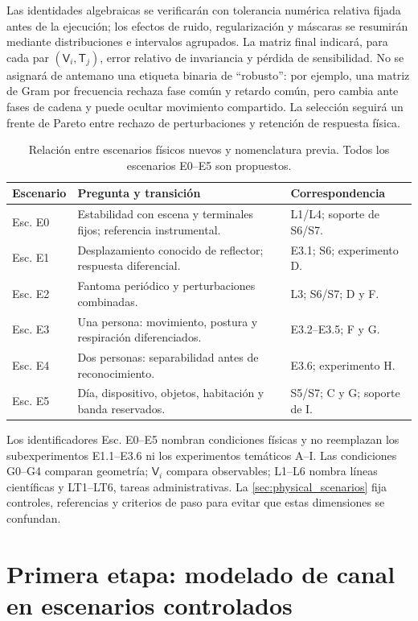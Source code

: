 Las identidades algebraicas se verificarán con tolerancia numérica relativa fijada
antes de la ejecución; los efectos de ruido, regularización y máscaras se resumirán
mediante distribuciones e intervalos agrupados. La matriz final indicará, para cada
par $(\mathsf V_i,\mathsf T_j)$, error relativo de invariancia y pérdida de sensibilidad.
No se asignará de antemano una etiqueta binaria de ``robusto'': por ejemplo, una matriz
de Gram por frecuencia rechaza fase común y retardo común, pero cambia ante fases de
cadena y puede ocultar movimiento compartido. La selección seguirá un frente de Pareto
entre rechazo de perturbaciones y retención de respuesta física.

\begin{table}[htbp]
\centering\small
\caption{Relación entre escenarios físicos nuevos y nomenclatura previa. Todos los escenarios E0--E5 son propuestos.}
\label{tab:scenario_program_map}
\begin{tabularx}{\textwidth}{P{1.6cm}L P{3.4cm}}
\toprule
Escenario & Pregunta y transición & Correspondencia\\
\midrule
Esc. E0 & Estabilidad con escena y terminales fijos; referencia instrumental. & L1/L4; soporte de S6/S7.\\
Esc. E1 & Desplazamiento conocido de reflector; respuesta diferencial. & E3.1; S6; experimento D.\\
Esc. E2 & Fantoma periódico y perturbaciones combinadas. & L3; S6/S7; D y F.\\
Esc. E3 & Una persona: movimiento, postura y respiración diferenciados. & E3.2--E3.5; F y G.\\
Esc. E4 & Dos personas: separabilidad antes de reconocimiento. & E3.6; experimento H.\\
Esc. E5 & Día, dispositivo, objetos, habitación y banda reservados. & S5/S7; C y G; soporte de I.\\
\bottomrule
\end{tabularx}
\end{table}

Los identificadores Esc. E0--E5 nombran condiciones físicas y no reemplazan los
subexperimentos E1.1--E3.6 ni los experimentos temáticos A--I. Las condiciones G0--G4
comparan geometría; $\mathsf V_i$ compara observables; L1--L6 nombra líneas científicas
y LT1--LT6, tareas administrativas. La \cref{sec:physical_scenarios} fija controles,
referencias y criterios de paso para evitar que estas dimensiones se confundan.

\section{Primera etapa: modelado de canal en escenarios controlados}
\label{sec:first_method_stage}

